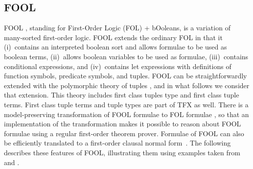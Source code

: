 \documentclass{easychair}
\begin{document}

\subsection{FOOL}
\label{FOOL}

FOOL \cite{KKV15}, standing for First-Order Logic (FOL) + bOoleans, is a 
variation of many-sorted first-order logic. FOOL extends the ordinary FOL in
that it (i)~contains an interpreted boolean sort and allows formulae to be used
as boolean terms, (ii)~allows boolean variables to be used as formulae,
(iii)~contains conditional expressions, and (iv)~contains let expressions with
definitions of function symbols, predicate symbols, and tuples. 
FOOL can be straightforwardly extended with the polymorphic theory of 
tuples \cite{KKV18}, and in what follows we consider that extension. 
This theory includes first class tuples type and first class tuple terms. 
First class tuple terms and tuple types are part of TFX as well. 
There is a model-preserving transformation of FOOL formulae to FOL formulae
\cite{KKV15}, so that an implementation of the transformation makes it 
possible to reason about FOOL formulae using a regular first-order theorem 
prover. 
Formulae of FOOL can also be efficiently translated to a first-order clausal 
normal form~\cite{KK+16-GCAI}. 
The following describes these features of FOOL, illustrating them using 
examples taken from \cite{KK+16} and \cite{KKV18}.
\end{document}

